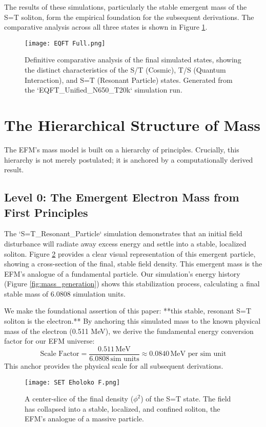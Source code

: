 \documentclass[11pt, twoside]{article}
\begin{document}
The results of these simulations, particularly the stable emergent mass of the S=T soliton, form the empirical foundation for the subsequent derivations. The comparative analysis across all three states is shown in Figure \ref{fig:grand_predictions}.

\begin{figure}[h!]
    \centering
    \texttt{[image: EQFT Full.png]}
    \caption{Definitive comparative analysis of the final simulated states, showing the distinct characteristics of the S/T (Cosmic), T/S (Quantum Interaction), and S=T (Resonant Particle) states. Generated from the `EQFT_Unified_N650_T20k` simulation run.}
    \label{fig:grand_predictions}
\end{figure}

\section{The Hierarchical Structure of Mass}
The EFM's mass model is built on a hierarchy of principles. Crucially, this hierarchy is not merely postulated; it is anchored by a computationally derived result.

\subsection{Level 0: The Emergent Electron Mass from First Principles}
The `S=T_Resonant_Particle` simulation demonstrates that an initial field disturbance will radiate away excess energy and settle into a stable, localized soliton. Figure \ref{fig:s_t_density} provides a clear visual representation of this emergent particle, showing a cross-section of the final, stable field density. This emergent mass is the EFM's analogue of a fundamental particle. Our simulation's energy history (Figure \ref{fig:mass_generation}) shows this stabilization process, calculating a final stable mass of \(6.0808\) simulation units.

We make the foundational assertion of this paper: **this stable, resonant S=T soliton is the electron.** By anchoring this simulated mass to the known physical mass of the electron (0.511 MeV), we derive the fundamental energy conversion factor for our EFM universe:
\[
\text{Scale Factor} = \frac{0.511 \, \text{MeV}}{6.0808 \, \text{sim units}} \approx 0.0840 \, \text{MeV per sim unit}
\]
This anchor provides the physical scale for all subsequent derivations.

\begin{figure}[h!]
    \centering
    \texttt{[image: SET Eholoko F.png]}
    \caption{A center-slice of the final density (\(\phi^2\)) of the S=T state. The field has collapsed into a stable, localized, and confined soliton, the EFM's analogue of a massive particle.}
    \label{fig:s_t_density}
\end{figure}
\end{document}

